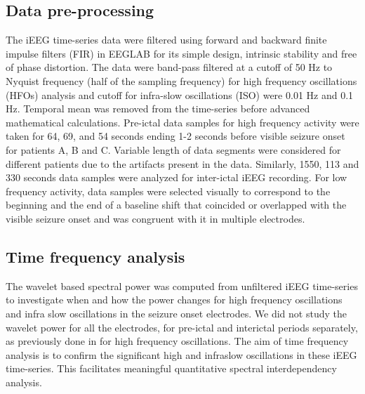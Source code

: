 \subsection{Data pre-processing}
The iEEG time-series data were filtered using forward and backward finite impulse filters (FIR) in EEGLAB \citep{delorme2004eeglab} for its simple design, intrinsic stability and free of phase distortion. The data were band-pass filtered at a cutoff of 50 Hz to Nyquist frequency (half of the sampling frequency) for high frequency oscillations (HFOs) analysis and cutoff for infra-slow oscillations (ISO) were 0.01 Hz and 0.1 Hz. Temporal mean was removed from the time-series before advanced mathematical calculations. Pre-ictal data samples for high frequency activity were taken for 64, 69, and 54 seconds ending 1-2 seconds before visible seizure onset for patients A, B and C. Variable length of data segments were considered for different patients due to the artifacts present in the data. Similarly, 1550, 113 and 330 seconds data samples were analyzed for inter-ictal iEEG recording. For low frequency activity, data samples were selected visually to correspond to the beginning and the end of a baseline shift that coincided or overlapped with the visible seizure onset and was congruent with it in multiple electrodes.

\subsection{Time frequency analysis}
The wavelet based spectral power was computed from unfiltered iEEG time-series to investigate when and how the power changes for high frequency oscillations and infra slow oscillations in the seizure onset electrodes. We did not study the wavelet power for all the electrodes, for pre-ictal and interictal periods separately, as previously done in \citep{adhikari2013localizing} for high frequency oscillations. The aim of time frequency analysis is to confirm the significant high and infraslow oscillations in these iEEG time-series. This facilitates meaningful quantitative spectral interdependency analysis.

